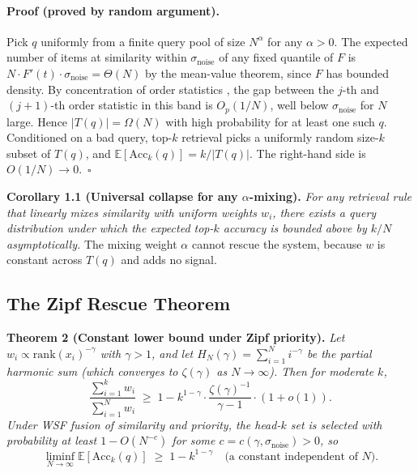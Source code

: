 \documentclass[11pt]{article}
\begin{document}
\paragraph{Proof (proved by random argument).}
Pick $q$ uniformly from a finite query pool of size $N^\alpha$ for
any $\alpha > 0$.  The expected number of items at similarity
within $\sigma_{\mathrm{noise}}$ of any fixed quantile of $F$ is
$N \cdot F'(t) \cdot \sigma_{\mathrm{noise}} = \Theta(N)$ by the
mean-value theorem, since $F$ has bounded density.  By
concentration of order statistics \citep{Bickel1976}, the gap
between the $j$-th and $(j+1)$-th order statistic in this band is
$O_p(1/N)$, well below $\sigma_{\mathrm{noise}}$ for $N$ large.
Hence $|T(q)| = \Omega(N)$ with high probability for at least one
such $q$.  Conditioned on a bad query, top-$k$ retrieval picks a
uniformly random size-$k$ subset of $T(q)$, and
$\mathbb{E}[\mathrm{Acc}_k(q)] = k / |T(q)|$.  The right-hand side
is $O(1/N) \to 0$.~$\square$

\textbf{Corollary 1.1 (Universal collapse for any $\alpha$-mixing).}
\emph{For any retrieval rule that linearly mixes similarity with
uniform weights $w_i$, there exists a query distribution under
which the expected top-$k$ accuracy is bounded above by $k/N$
asymptotically.}  The mixing weight $\alpha$ cannot rescue the
system, because $w$ is constant across $T(q)$ and adds no signal.

\subsection{The Zipf Rescue Theorem}
\label{app:erdos-thm2}

\textbf{Theorem 2 (Constant lower bound under Zipf priority).}
\emph{Let $w_i \propto \mathrm{rank}(x_i)^{-\gamma}$ with
$\gamma > 1$, and let $H_N(\gamma) = \sum_{i=1}^N i^{-\gamma}$ be
the partial harmonic sum (which converges to $\zeta(\gamma)$ as
$N \to \infty$).  Then for moderate $k$,}
\begin{equation}
\frac{\sum_{i=1}^{k} w_i}{\sum_{i=1}^{N} w_i}
\;\ge\;
1 - k^{1-\gamma} \cdot \frac{\zeta(\gamma)^{-1}}{\gamma - 1} \cdot (1 + o(1)).
\label{eq:thm2-mass}
\end{equation}
\emph{Under WSF fusion of similarity and priority, the head-$k$
set is selected with probability at least $1 - O(N^{-c})$ for some
$c = c(\gamma, \sigma_{\mathrm{noise}}) > 0$, so}
\begin{equation}
\liminf_{N \to \infty} \mathbb{E}[\mathrm{Acc}_k(q)]
\;\ge\;
1 - k^{1-\gamma}
\quad \text{(a constant independent of } N\text{).}
\label{eq:thm2-acc}
\end{equation}
\end{document}
